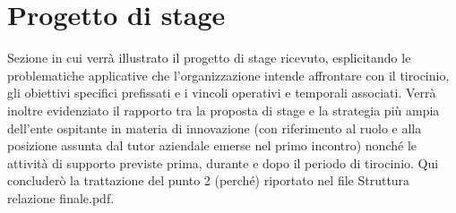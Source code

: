 \section{Progetto di stage}

Sezione in cui verrà illustrato il progetto di stage ricevuto, esplicitando le problematiche applicative che l'organizzazione intende affrontare con il tirocinio, 
gli obiettivi specifici prefissati e i vincoli operativi e temporali associati. Verrà inoltre evidenziato il rapporto tra la proposta di stage e la strategia più ampia dell'ente ospitante 
in materia di innovazione (con riferimento al ruolo e alla posizione assunta dal tutor aziendale emerse nel primo incontro) 
nonché le attività di supporto previste prima, durante e dopo il periodo di tirocinio.
Qui concluderò la trattazione del punto 2 (perché) riportato nel file Struttura relazione finale.pdf.